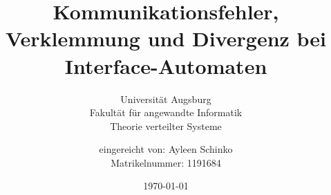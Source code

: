 \begin{titlepage}
  \titlehead{\center{}\large \textbf{Bachelorarbeit}\\
im Studiengang Bachelor Informatik}
\title{Kommunikationsfehler, Verklemmung und Divergenz bei Interface-Automaten}
\date{\small %
\today}
\author{\small eingereicht von: Ayleen Schinko\\
\hspace{4.7cm}\small Matrikelnummer: 1191684}
\subtitle{\vspace{1cm}Universität Augsburg\\
Fakultät für angewandte Informatik\\
Theorie verteilter Systeme}

\publishers{\small Aufgabensteller: Prof. Dr. Walter Vogler}

\maketitle
\end{titlepage}
